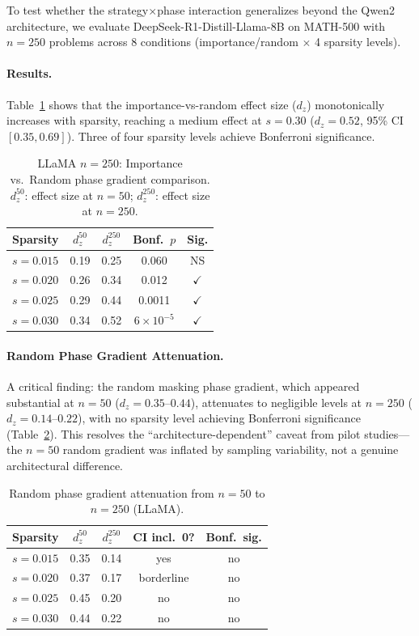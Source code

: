 \documentclass[11pt]{article}
\begin{document}
To test whether the strategy$\times$phase interaction generalizes beyond the Qwen2 architecture, we evaluate DeepSeek-R1-Distill-Llama-8B on MATH-500 with $n=250$ problems across 8 conditions (importance/random $\times$ 4 sparsity levels).

\paragraph{Results.}
Table~\ref{tab:llama_n250} shows that the importance-vs-random effect size ($d_z$) monotonically increases with sparsity, reaching a medium effect at $s=0.30$ ($d_z=0.52$, 95\% CI $[0.35, 0.69]$). Three of four sparsity levels achieve Bonferroni significance.

\begin{table}[h]
\centering
\caption{LLaMA $n=250$: Importance vs.\ Random phase gradient comparison. $d_z^{50}$: effect size at $n=50$; $d_z^{250}$: effect size at $n=250$.}
\label{tab:llama_n250}
\begin{tabular}{lcccc}
\toprule
Sparsity & $d_z^{50}$ & $d_z^{250}$ & Bonf.\ $p$ & Sig. \\
\midrule
$s=0.015$ & 0.19 & 0.25 & 0.060 & NS \\
$s=0.020$ & 0.26 & 0.34 & 0.012 & $\checkmark$ \\
$s=0.025$ & 0.29 & 0.44 & 0.0011 & $\checkmark$ \\
$s=0.030$ & 0.34 & 0.52 & $6\times10^{-5}$ & $\checkmark$ \\
\bottomrule
\end{tabular}
\end{table}

\paragraph{Random Phase Gradient Attenuation.}
A critical finding: the random masking phase gradient, which appeared substantial at $n=50$ ($d_z=0.35$--$0.44$), attenuates to negligible levels at $n=250$ ($d_z=0.14$--$0.22$), with no sparsity level achieving Bonferroni significance (Table~\ref{tab:random_attenuation}). This resolves the ``architecture-dependent'' caveat from pilot studies---the $n=50$ random gradient was inflated by sampling variability, not a genuine architectural difference.

\begin{table}[h]
\centering
\caption{Random phase gradient attenuation from $n=50$ to $n=250$ (LLaMA).}
\label{tab:random_attenuation}
\begin{tabular}{lcccc}
\toprule
Sparsity & $d_z^{50}$ & $d_z^{250}$ & CI incl.\ 0? & Bonf.\ sig. \\
\midrule
$s=0.015$ & 0.35 & 0.14 & yes & no \\
$s=0.020$ & 0.37 & 0.17 & borderline & no \\
$s=0.025$ & 0.45 & 0.20 & no & no \\
$s=0.030$ & 0.44 & 0.22 & no & no \\
\bottomrule
\end{tabular}
\end{table}
\end{document}
